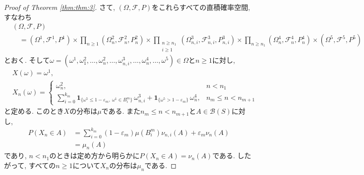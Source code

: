 \begin{proof}[Proof of Theorem \ref{thm:thm:3}]
    さて, $(\Omega,\mathcal{F},P)$をこれらすべての直積確率空間, すなわち
    \begin{align*}
         & (\Omega,\mathcal{F},P)                                                                                                       \\
         & \quad =(\Omega^1,\mathcal{F}^1,P^1)\times \prod_{n\geq 1} (\Omega^2_n,\mathcal{F}^2_n,P^2_n)\times\prod_{\substack{n\geq n_1 \\i\geq 1}}(\Omega^3_{n,i},\mathcal{F}^3_{n,i},P^3_{n,i})\times \prod_{n\geq n_1}(\Omega^4_n,\mathcal{F}^4_n,P^4_n) \times (\Omega^5,\mathcal{F}^5,P^5)
    \end{align*}
    とおく.
    そして$\omega=(\omega^1,\omega^2_1,\dots,\omega^2_n,\dots,\omega^3_{n,i},\dots,\omega^4_n,\dots,\omega^5)\in\Omega$と$n\geq 1$に対し,
    \begin{align*}
         & X(\omega) = \omega^1, \\[.5em]
         & X_n(\omega) =
        \begin{cases}
            \omega^2_n,                                                                                                                                                                       & n<n_1                \\[.5em]
            \displaystyle \sum_{i=0}^{k_m} \boldsymbol{1}_{\{\omega^5\leq 1-\varepsilon_m,~ \omega^1\in B^m_i\}}\,\omega^3_{n,i} + \boldsymbol{1}_{\{\omega^5>1-\varepsilon_m\}}\,\omega^4_n, & n_m \leq n < n_{m+1}
        \end{cases}
    \end{align*}
    と定める.
    このとき$X$の分布は$\mu$である.
    また$n_m \leq n < n_{m+1}$と$A\in\mathcal{B}(S)$に対し,
    \begin{align*}
        P(X_n\in A)
         & = \sum_{i=0}^{k_m}(1-\varepsilon_m)\mu(B^m_i)\nu_{n,i}(A) + \varepsilon_m \nu_n(A) \\
         & = \mu_n(A)
    \end{align*}
    であり, $n<n_1$のときは定め方から明らかに$P(X_n\in A)=\nu_n(A)$である.
    したがって, すべての$n\geq 1$について$X_n$の分布は$\mu_n$である.


\end{proof}
